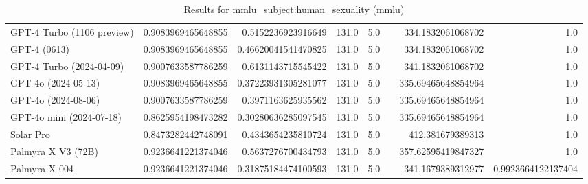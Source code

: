 \begin{table}[htp]
{\begin{tabular}{lrrrrrrr}
GPT-4 Turbo (1106 preview) & 0.9083969465648855 & 0.5152236923916649 & 131.0 & 5.0 &  & 334.1832061068702 & 1.0 \\
GPT-4 (0613) & 0.9083969465648855 & 0.46620041541470825 & 131.0 & 5.0 &  & 334.1832061068702 & 1.0 \\
GPT-4 Turbo (2024-04-09) & 0.9007633587786259 & 0.6131143715545422 & 131.0 & 5.0 &  & 341.1832061068702 & 1.0 \\
GPT-4o (2024-05-13) & 0.9083969465648855 & 0.37223931305281077 & 131.0 & 5.0 &  & 335.69465648854964 & 1.0 \\
GPT-4o (2024-08-06) & 0.9007633587786259 & 0.3971163625935562 & 131.0 & 5.0 &  & 335.69465648854964 & 1.0 \\
GPT-4o mini (2024-07-18) & 0.8625954198473282 & 0.30280636285097545 & 131.0 & 5.0 &  & 335.69465648854964 & 1.0 \\
Solar Pro & 0.8473282442748091 & 0.4343654235810724 & 131.0 & 5.0 &  & 412.381679389313 & 1.0 \\
Palmyra X V3 (72B) & 0.9236641221374046 & 0.5637276700434793 & 131.0 & 5.0 &  & 357.62595419847327 & 1.0 \\
Palmyra-X-004 & 0.9236641221374046 & 0.31875184474100593 & 131.0 & 5.0 &  & 341.1679389312977 & 0.9923664122137404 \\
\bottomrule
\end{tabular}}
\caption{Results for mmlu_subject:human_sexuality (mmlu)}
\label{fig:mmlu_subject:human_sexuality (mmlu)}
\end{table}